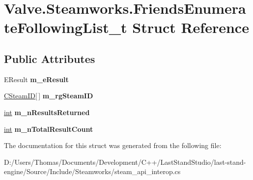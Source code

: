 \hypertarget{structValve_1_1Steamworks_1_1FriendsEnumerateFollowingList__t}{}\section{Valve.\+Steamworks.\+Friends\+Enumerate\+Following\+List\+\_\+t Struct Reference}
\label{structValve_1_1Steamworks_1_1FriendsEnumerateFollowingList__t}
\subsection*{Public Attributes}
\begin{DoxyCompactItemize}
\item 
\hypertarget{structValve_1_1Steamworks_1_1FriendsEnumerateFollowingList__t_a4df396a8006174ea889b055974002ef2}{}E\+Result {\bfseries m\+\_\+e\+Result}\label{structValve_1_1Steamworks_1_1FriendsEnumerateFollowingList__t_a4df396a8006174ea889b055974002ef2}

\item 
\hypertarget{structValve_1_1Steamworks_1_1FriendsEnumerateFollowingList__t_a324b586ea14c2cfd6e8ed8ad3388a892}{}\hyperlink{structValve_1_1Steamworks_1_1CSteamID}{C\+Steam\+I\+D}\mbox{[}$\,$\mbox{]} {\bfseries m\+\_\+rg\+Steam\+I\+D}\label{structValve_1_1Steamworks_1_1FriendsEnumerateFollowingList__t_a324b586ea14c2cfd6e8ed8ad3388a892}

\item 
\hypertarget{structValve_1_1Steamworks_1_1FriendsEnumerateFollowingList__t_ae61a7696e5eb693a8b56d9fb8a21a2bf}{}\hyperlink{SDL__thread_8h_a6a64f9be4433e4de6e2f2f548cf3c08e}{int} {\bfseries m\+\_\+n\+Results\+Returned}\label{structValve_1_1Steamworks_1_1FriendsEnumerateFollowingList__t_ae61a7696e5eb693a8b56d9fb8a21a2bf}

\item 
\hypertarget{structValve_1_1Steamworks_1_1FriendsEnumerateFollowingList__t_a6da1f048def18101678e861824ad9c5d}{}\hyperlink{SDL__thread_8h_a6a64f9be4433e4de6e2f2f548cf3c08e}{int} {\bfseries m\+\_\+n\+Total\+Result\+Count}\label{structValve_1_1Steamworks_1_1FriendsEnumerateFollowingList__t_a6da1f048def18101678e861824ad9c5d}

\end{DoxyCompactItemize}


The documentation for this struct was generated from the following file\+:\begin{DoxyCompactItemize}
\item 
D\+:/\+Users/\+Thomas/\+Documents/\+Development/\+C++/\+Last\+Stand\+Studio/last-\/stand-\/engine/\+Source/\+Include/\+Steamworks/steam\+\_\+api\+\_\+interop.\+cs\end{DoxyCompactItemize}
